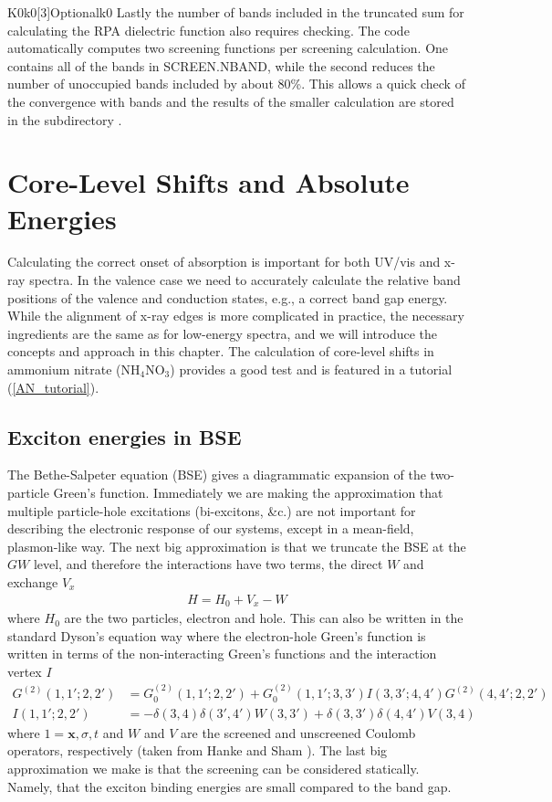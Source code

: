 \documentclass[11pt]{report}
\begin{document}
\begin{Card}{K0}{k0[3]}{Optional}{k0}
Lastly the number of bands included in the truncated sum for calculating the RPA dielectric function also requires checking. The code automatically computes two screening functions per screening calculation. One contains all of the bands in SCREEN.NBAND, while the second reduces the number of unoccupied bands included by about 80\%. This allows a quick check of the convergence with bands and the results of the smaller calculation are stored in the subdirectory .


\chapter{Core-Level Shifts and Absolute Energies}

Calculating the correct onset of absorption is important for both UV/vis and x-ray spectra. 
In the valence case we need to accurately calculate the relative band positions of the valence and conduction states, e.g., a correct band gap energy. 
While the alignment of x-ray edges is more complicated in practice, the necessary ingredients are the same as for  low-energy spectra, and we will introduce the concepts and approach in this chapter. 
The calculation of core-level shifts in ammonium nitrate (NH$_4$NO$_3$) provides a good test and is featured in a tutorial (\ref{AN_tutorial}). 

\section{Exciton energies in BSE}
\label{CLS.bse}
The Bethe-Salpeter equation (BSE) gives a diagrammatic expansion of the two-particle Green's function. 
Immediately we are making the approximation that multiple particle-hole excitations (bi-excitons, \&c.) are not important for describing the electronic response of our systems, except in a mean-field, plasmon-like way. 
The next big approximation is that we truncate the BSE at the $GW$ level, and therefore the interactions have two terms, the direct $W$ and exchange $V_x$
\begin{align}
H = H_0 + V_x - W
\end{align}
where $H_0$ are the two particles, electron and hole. 
This can also be written in the standard Dyson's equation way where the electron-hole Green's function is written in terms of the non-interacting Green's functions and the interaction vertex $I$
\begin{align}
G^{(2)}(1,1';2,2') &= G_0^{(2)}(1,1';2,2')  + G_0^{(2)}(1,1';3,3') I(3,3';4,4') G^{(2)}(4,4';2,2') \label{2e-gf} \\
I(1,1';2,2') &= -\delta(3,4) \delta(3',4') W(3,3') + \delta(3,3') \delta(4,4') V(3,4)
\end{align}
where $1=\mathbf{x},\sigma,t$ and $W$ and $V$ are the screened and unscreened Coulomb operators, respectively (taken from Hanke and Sham \cite{PhysRevB.21.4656}). 
The last big approximation we make is that the screening can be considered statically.
Namely, that the exciton binding energies are small compared to the band gap. 


\end{Card}
\end{document}
